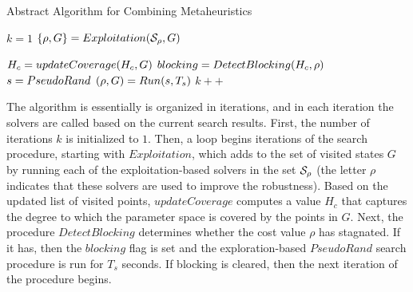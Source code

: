 \begin{algorithm}
\caption{Abstract Algorithm for Combining Metaheuristics \label{algoSolverCombination}}
\begin{algorithmic}
\State {}
\State {}
\State {}
\State {}
\State

\State $k= 1$
		\State {}
  		\State $\{ \rho, G \} = Exploitation(\mathcal{S_{\rho}}, G)$ 	 
	 
         \State
\State $H_c = updateCoverage(H_c,  G)$
\State
\State {}
\State $blocking =  DetectBlocking(H_c, \rho)$ 
	 \State $s = PseudoRand$
	 \State {}   
	 \State $(\rho, G)= Run(s, T_{s})$ 
 \EndIf	
 \State        
\State $k++$
\EndWhile
\end{algorithmic}
\end{algorithm}

The algorithm is essentially is organized in iterations, and in each iteration the solvers are called based on the current search results. 
First, the number of iterations $k$ is initialized to $1$. Then, a loop begins iterations of the search procedure, starting with $Exploitation$, which adds to the set of visited states $G$ by running each of the exploitation-based solvers in the set $\mathcal{S_{\rho}}$ (the letter $\rho$ indicates that these solvers are used to improve the robustness). Based on the updated list of visited points, $updateCoverage$ computes a value $H_c$ that captures the degree to which the parameter space is covered by the points in $G$.  Next, the procedure $DetectBlocking$ determines whether the cost value $\rho$ has stagnated. If it has, then the $blocking$ flag is set and the exploration-based $PseudoRand$ search procedure is run for $T_s$ seconds. If blocking is cleared, then the next iteration of the procedure begins.

